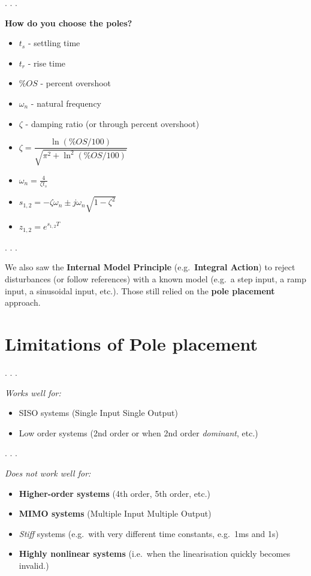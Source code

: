 \documentclass[
  letterpaper,
  DIV=11,
  numbers=noendperiod,
  oneside]{scrartcl}
\providecommand{\tightlist}{%
  \setlength{\itemsep}{0pt}\setlength{\parskip}{0pt}}
\begin{document}
. . .

\textbf{How do you choose the poles?}

\begin{itemize}
\tightlist
\item
  \(t_s\) - settling time
\item
  \(t_r\) - rise time
\item
  \(\%OS\) - percent overshoot
\item
  \(\omega_n\) - natural frequency
\item
  \(\zeta\) - damping ratio (or through percent overshoot)
\end{itemize}

\begin{itemize}
\tightlist
\item
  \(\zeta = \dfrac{\ln(\%OS/100)}{\sqrt{\pi^2 + \ln^2(\%OS/100)}}\)
\item
  \(\omega_n = \frac{4}{\zeta t_s}\)
\item
  \(s_{1,2} = -\zeta \omega_n \pm j \omega_n \sqrt{1-\zeta^2}\)
\item
  \(z_{1,2} = e^{s_{1,2}T}\)
\end{itemize}

. . .

We also saw the \textbf{Internal Model Principle} (e.g.~\textbf{Integral
Action}) to reject disturbances (or follow references) with a known
model (e.g.~a step input, a ramp input, a sinusoidal input, etc.). Those
still relied on the \textbf{pole placement} approach.

\section{Limitations of Pole
placement}\label{limitations-of-pole-placement}

. . .

\emph{Works well for:}

\begin{itemize}
\tightlist
\item
  SISO systems (Single Input Single Output)
\item
  Low order systems (2nd order or when 2nd order \emph{dominant}, etc.)
\end{itemize}

. . .

\emph{Does not work well for:}

\begin{itemize}
\tightlist
\item
  \textbf{Higher-order systems} (4th order, 5th order, etc.)
\item
  \textbf{MIMO systems} (Multiple Input Multiple Output)
\item
  \emph{Stiff} systems (e.g.~with very different time constants,
  e.g.~1ms and 1s)
\item
  \textbf{Highly nonlinear systems} (i.e.~when the linearisation quickly
  becomes invalid.)
\end{itemize}
\end{document}

